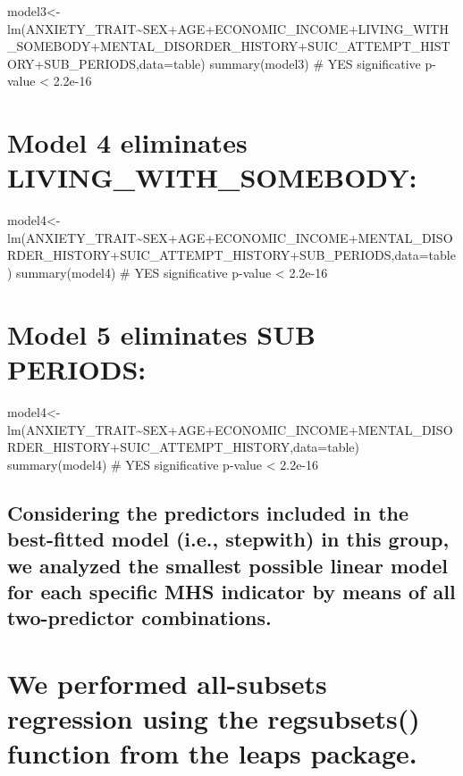 \documentclass[
]{book}
\begin{document}
model3\textless-lm(ANXIETY\_TRAIT\textasciitilde SEX+AGE+ECONOMIC\_INCOME+LIVING\_WITH\_SOMEBODY+MENTAL\_DISORDER\_HISTORY+SUIC\_ATTEMPT\_HISTORY+SUB\_PERIODS,data=table)
summary(model3)
\# YES significative p-value \textless{} 2.2e-16

\hypertarget{model-4-eliminates-living_with_somebody-1}{%
\chapter{Model 4 eliminates LIVING\_WITH\_SOMEBODY:}\label{model-4-eliminates-living_with_somebody-1}}

model4\textless-lm(ANXIETY\_TRAIT\textasciitilde SEX+AGE+ECONOMIC\_INCOME+MENTAL\_DISORDER\_HISTORY+SUIC\_ATTEMPT\_HISTORY+SUB\_PERIODS,data=table)
summary(model4)
\# YES significative p-value \textless{} 2.2e-16

\hypertarget{model-5-eliminates-sub-periods}{%
\chapter{Model 5 eliminates SUB PERIODS:}\label{model-5-eliminates-sub-periods}}

model4\textless-lm(ANXIETY\_TRAIT\textasciitilde SEX+AGE+ECONOMIC\_INCOME+MENTAL\_DISORDER\_HISTORY+SUIC\_ATTEMPT\_HISTORY,data=table)
summary(model4)
\# YES significative p-value \textless{} 2.2e-16

\hypertarget{considering-the-predictors-included-in-the-best-fitted-model-i.e.-stepwith-in-this-group-we-analyzed-the-smallest-possible-linear-model-for-each-specific-mhs-indicator-by-means-of-all-two-predictor-combinations.-2}{%
\section{Considering the predictors included in the best-fitted model (i.e., stepwith) in this group, we analyzed the smallest possible linear model for each specific MHS indicator by means of all two-predictor combinations.}\label{considering-the-predictors-included-in-the-best-fitted-model-i.e.-stepwith-in-this-group-we-analyzed-the-smallest-possible-linear-model-for-each-specific-mhs-indicator-by-means-of-all-two-predictor-combinations.-2}}

\hypertarget{we-performed-all-subsets-regression-using-the-regsubsets-function-from-the-leaps-package.-2}{%
\chapter{We performed all-subsets regression using the regsubsets() function from the leaps package.}\label{we-performed-all-subsets-regression-using-the-regsubsets-function-from-the-leaps-package.-2}}
\end{document}
